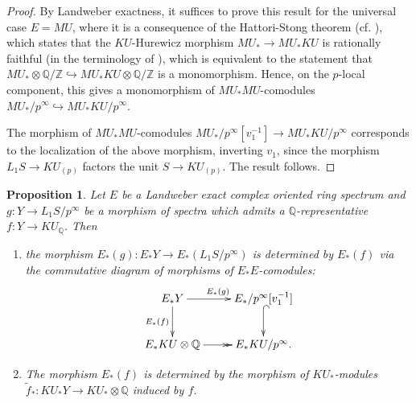 \documentclass[10pt,a4paper]{amsart}
\newtheorem{prop}[thm]{Proposition}
\theoremstyle{definition}
\theoremstyle{remark}
\newcommand{\zed}{\mathbb{Z}}
\newcommand{\rat}{\mathbb{Q}}
\begin{document}
\begin{proof} By Landweber exactness,
	it suffices to prove this result for the universal case $E=MU$, where it is a consequence of the Hattori-Stong theorem (cf. \cite[Proposition 20.33]{switzer}), which states that the $KU$-Hurewicz morphism $MU_* \rightarrow MU_*KU$ is rationally faithful (in the terminology of \cite[Definition 1.1]{laures}), which is equivalent to the statement that $MU_* \otimes \rat/ \zed \hookrightarrow MU_* KU \otimes \rat/ \zed$ is a monomorphism. Hence, on the $p$-local component, this gives a monomorphism of $MU_*MU$-comodules $MU_* /p^\infty \hookrightarrow MU_* KU /p^\infty$.

	The morphism of $MU_*MU$-comodules $MU_* /p^\infty [v_1^{-1}] \rightarrow MU_* KU/p^\infty$ corresponds to the localization of the above morphism, inverting $v_1$, since the morphism $L_1 S \rightarrow KU_{(p)}$ factors the unit $S \rightarrow KU_{(p)}$. The result follows.
\end{proof}



\begin{prop}
\label{prop:f,g-Landweber}
Let $E$ be a Landweber exact complex oriented ring spectrum and $g: Y \rightarrow L_1 S /p^\infty$ be a morphism of spectra which admits a $\rat$-representative $f: Y \rightarrow KU_\rat$. Then
\begin{enumerate}
	\item
	the morphism
$E_* (g) : E_* Y \rightarrow E_* (L_1 S /p^\infty)$ is determined by $E_* (f)$ via the commutative diagram of morphisms of  $E_*E$-comodules:
\[
	\xymatrix{
E_* Y
\ar[r]^{E_* (g)}
\ar[d]_{E_*(f)}
&
E_*/p^\infty [v_1^{-1}]
\ar@{^(->}[d]
\\
E_* KU \otimes \rat
\ar@{->>}[r]
&
E_* KU/p^\infty .
}
\]
\item
The morphism $E_* (f)$  is determined by the morphism of $KU_*$-modules $\tilde{f}_* : KU_*  Y \rightarrow KU_*
\otimes \rat$ induced by $f$.
\end{enumerate}
\end{prop}
\end{document}
